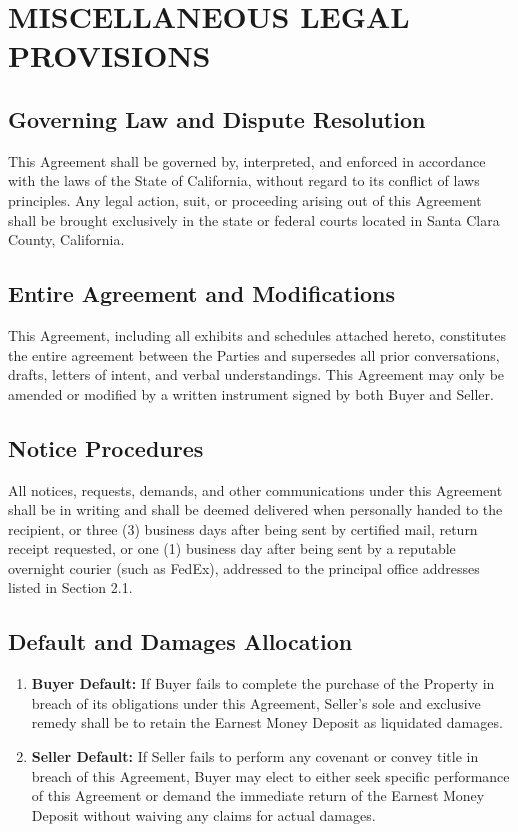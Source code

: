 \section{MISCELLANEOUS LEGAL PROVISIONS}

\subsection{Governing Law and Dispute Resolution}
This Agreement shall be governed by, interpreted, and enforced in accordance with the laws of the State of California, without regard to its conflict of laws principles. Any legal action, suit, or proceeding arising out of this Agreement shall be brought exclusively in the state or federal courts located in Santa Clara County, California.

\subsection{Entire Agreement and Modifications}
This Agreement, including all exhibits and schedules attached hereto, constitutes the entire agreement between the Parties and supersedes all prior conversations, drafts, letters of intent, and verbal understandings. This Agreement may only be amended or modified by a written instrument signed by both Buyer and Seller.

\subsection{Notice Procedures}
All notices, requests, demands, and other communications under this Agreement shall be in writing and shall be deemed delivered when personally handed to the recipient, or three (3) business days after being sent by certified mail, return receipt requested, or one (1) business day after being sent by a reputable overnight courier (such as FedEx), addressed to the principal office addresses listed in Section 2.1.

\subsection{Default and Damages Allocation}
\begin{enumerate}
    \item \textbf{Buyer Default:} If Buyer fails to complete the purchase of the Property in breach of its obligations under this Agreement, Seller's sole and exclusive remedy shall be to retain the Earnest Money Deposit as liquidated damages.
    \item \textbf{Seller Default:} If Seller fails to perform any covenant or convey title in breach of this Agreement, Buyer may elect to either seek specific performance of this Agreement or demand the immediate return of the Earnest Money Deposit without waiving any claims for actual damages.
\end{enumerate}
